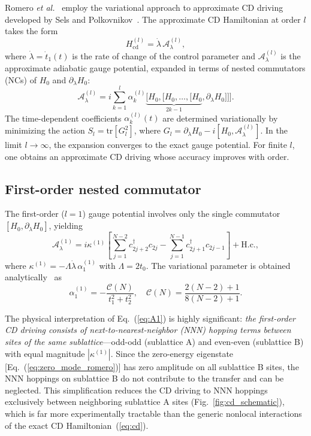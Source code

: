 \documentclass[
  reprint,
  amsmath,
  amssymb,
  aps,
  prb,
  longbibliography,
]{revtex4-2}
\begin{document}
Romero \textit{et al.}~\cite{Romero2024} employ the variational approach
to approximate CD driving developed by Sels and
Polkovnikov~\cite{Sels2017}. The approximate CD Hamiltonian at order $l$
takes the form
\begin{equation}
  H_{\mathrm{cd}}^{(l)} = \dot{\lambda}\, \mathcal{A}_\lambda^{(l)},
  \label{eq:Hcd}
\end{equation}
where $\dot{\lambda} = \dot{t}_1(t)$ is the rate of change of the control
parameter and $\mathcal{A}_\lambda^{(l)}$ is the approximate adiabatic gauge
potential, expanded in terms of nested commutators (NCs) of $H_0$ and
$\partial_\lambda H_0$:
\begin{equation}
  \mathcal{A}_\lambda^{(l)} = i \sum_{k=1}^{l} \alpha_k^{(l)}
  \underbrace{[H_0, [H_0, \ldots, [H_0}_{2k-1},
  \partial_\lambda H_0]]].
  \label{eq:gauge_potential}
\end{equation}
The time-dependent coefficients $\alpha_k^{(l)}(t)$ are determined variationally
by minimizing the action $S_l = \mathrm{tr}[G_l^2]$, where
$G_l = \partial_\lambda H_0 - i[H_0, \mathcal{A}_\lambda^{(l)}]$. In the limit
$l \to \infty$, the expansion converges to the exact gauge potential. For finite
$l$, one obtains an approximate CD driving whose accuracy improves with order.

\subsection{First-order nested commutator}
\label{sec:first_order}

The first-order ($l = 1$) gauge potential involves only the single commutator
$[H_0, \partial_\lambda H_0]$, yielding~\cite{Romero2024}
\begin{equation}
  \mathcal{A}_\lambda^{(1)} = i\kappa^{(1)} \left[
  \sum_{j=1}^{N-2} c_{2j+2}^\dagger c_{2j}
  - \sum_{j=1}^{N-1} c_{2j+1}^\dagger c_{2j-1} \right] + \text{H.c.},
  \label{eq:A1}
\end{equation}
where $\kappa^{(1)} = -\Lambda\dot{\lambda}\,\alpha_1^{(1)}$ with
$\Lambda = 2t_0$. The variational parameter is obtained
analytically~\cite{Romero2024, Sels2017} as
\begin{equation}
  \alpha_1^{(1)} = -\frac{\mathcal{C}(N)}{t_1^2 + t_2^2},
  \quad
  \mathcal{C}(N) = \frac{2(N-2) + 1}{8(N-2) + 1}.
  \label{eq:alpha1}
\end{equation}

The physical interpretation of Eq.~(\ref{eq:A1}) is highly significant:
\emph{the first-order CD driving consists of next-to-nearest-neighbor (NNN)
hopping terms between sites of the same sublattice}---odd-odd (sublattice A)
and even-even (sublattice B) with equal magnitude $|\kappa^{(1)}|$.
Since the zero-energy eigenstate [Eq.~(\ref{eq:zero_mode_romero})] has zero
amplitude on all sublattice B sites, the NNN hoppings on sublattice B do not
contribute to the transfer and can be neglected. This simplification reduces
the CD driving to NNN hoppings exclusively between neighboring sublattice A
sites (Fig.~\ref{fig:cd_schematic}), which is far more experimentally
tractable than the generic nonlocal interactions of the exact CD
Hamiltonian~(\ref{eq:cd}).
\end{document}
